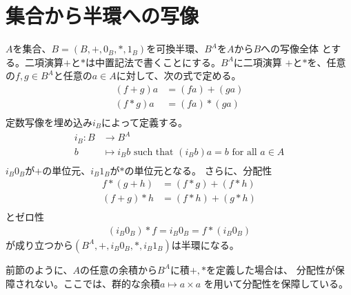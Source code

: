 \section{集合から半環への写像}\label{s1:集合から半環への写像} %
	$A$を集合、$B=(B,+,0_B,*,1_B)$を可換半環、$B^A$を$A$から$B$への写像全体
	とする。二項演算$+$と$*$は中置記法で書くことにする。$B^A$に二項演算
	$+$と$*$を、任意の$f,g\in B^A$と任意の$a\in A$に対して、次の式で定める。
	\begin{equation}\begin{split} %
		(f+g)a &= (fa)+(ga) \\
		(f*g)a &= (fa)*(ga) \\
	\end{split}\end{equation} %
	定数写像を埋め込み$i_B$によって定義する。
	\begin{equation}\label{eq:constant-map}\begin{split} %
		i_B: B &\to B^A \\
			b &\mapsto i_Bb \text{ such that } (i_Bb)a = b \text{ for all }a\in A \\
	\end{split}\end{equation} %
	$i_B0_B$が$+$の単位元、$i_B1_B$が$*$の単位元となる。
	さらに、分配性
	\begin{equation*}\begin{split} %
		f*(g+h) &= (f*g)+(f*h) \\
		(f+g)*h &= (f*h)+(g*h) \\
	\end{split}\end{equation*} %
	とゼロ性
	\begin{equation*}\begin{split} %
		(i_B0_B)*f = i_B0_B = f*(i_B0_B)
	\end{split}\end{equation*} %
	が成り立つから$(B^A,+,i_B0_B,*,i_B1_B)$は半環になる。

	前節のように、$A$の任意の余積から$B^A$に積$+,*$を定義した場合は、
	分配性が保障されない。ここでは、群的な余積$a\mapsto a\times a$
	を用いて分配性を保障している。

